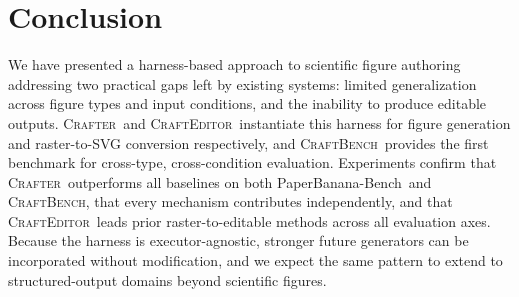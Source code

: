 \documentclass{article}
\newcommand{\Crafter}{\textsc{Crafter}\xspace}
\newcommand{\Editor}{\textsc{CraftEditor}\xspace}
\newcommand{\CrafterBench}{\textsc{CraftBench}\xspace}
\newcommand{\PaperBananaBench}{PaperBanana-Bench\xspace}
\begin{document}

\section{Conclusion}
\label{sec:conclusion}

We have presented a harness-based approach to scientific figure authoring addressing two practical gaps left by existing systems: limited generalization across figure types and input conditions, and the inability to produce editable outputs. \Crafter\ and \Editor\ instantiate this harness for figure generation and raster-to-SVG conversion respectively, and \CrafterBench\ provides the first benchmark for cross-type, cross-condition evaluation. Experiments confirm that \Crafter\ outperforms all baselines on both \PaperBananaBench\ and \CrafterBench, that every mechanism contributes independently, and that \Editor\ leads prior raster-to-editable methods across all evaluation axes. Because the harness is executor-agnostic, stronger future generators can be incorporated without modification, and we expect the same pattern to extend to structured-output domains beyond scientific figures.


% 



\appendix
{}
\renewcommand{\thefigure}{A\arabic{figure}}
\renewcommand{\thetable}{A\arabic{table}}
\setcounter{figure}{0}
\setcounter{table}{0}
\end{document}
